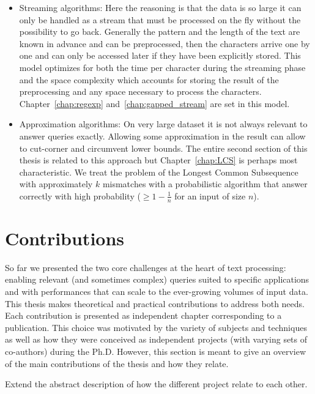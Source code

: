 \begin{itemize}
\item Streaming algorithms: Here the reasoning is that the data is so large it can only be handled as a stream that must be processed on the fly without the possibility to go back. Generally the pattern and the length of the text are known in advance and can be preprocessed, then the characters arrive one by one and can only be accessed later if they have been explicitly stored. This model optimizes for both the time per character during the streaming phase and the space complexity which accounts for storing the result of the preprocessing and any space necessary to process the characters. Chapter~\ref{chap:regexp} and~\ref{chap:gapped_stream} are set in this model.
\item Approximation algorithms: On very large dataset it is not always relevant to answer queries exactly. Allowing some approximation in the result can allow to cut-corner and circumvent lower bounds. The entire second section of this thesis is related to this approach but Chapter~\ref{chap:LCS} is perhaps most characteristic. We treat the problem of the Longest Common Subsequence with approximately $k$ mismatches with a probabilistic algorithm that answer correctly with high probability ($\geq 1 - \frac{1}{n}$ for an input of size $n$).
\end{itemize}

\section{Contributions}\label{intro:sec:contrib}

So far we presented the two core challenges at the heart of text processing: enabling relevant (and sometimes complex) queries suited to specific applications and with performances that can scale to the ever-growing volumes of input data.
%
This thesis makes theoretical and practical contributions to address both needs. 
Each contribution is presented as independent chapter corresponding to a publication. This choice was motivated by the variety of subjects and techniques as well as how they were conceived as independent projects (with varying sets of co-authors) during the Ph.D. However, this section is meant to give an overview of the main contributions of the thesis and how they relate.

Extend the abstract description of how the different project relate to each other.
